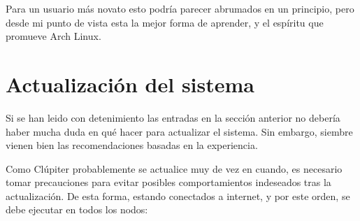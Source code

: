 Para un usuario más novato esto podría parecer abrumados en un principio, pero desde mi punto de vista esta la mejor forma de aprender, y el espíritu que promueve Arch Linux. 

\section{Actualización del sistema}
Si se han leido con detenimiento las entradas en la sección anterior no debería haber mucha duda en qué hacer para actualizar el sistema. Sin embargo, siembre vienen bien las recomendaciones basadas en la experiencia.

Como Clúpiter probablemente se actualice muy de vez en cuando, es necesario tomar precauciones para evitar posibles comportamientos indeseados tras la actualización. De esta forma, estando conectados a internet, y por este orden, se debe ejecutar en todos los nodos:

